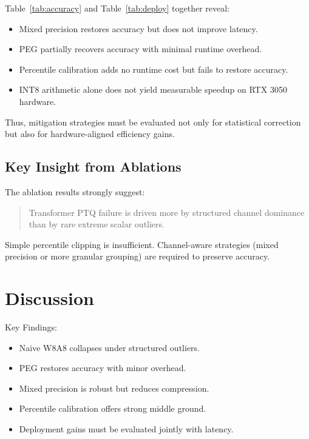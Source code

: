 \documentclass[conference]{IEEEtran}
\begin{document}
Table~\ref{tab:accuracy} and Table~\ref{tab:deploy} together reveal:

\begin{itemize}
\item Mixed precision restores accuracy but does not improve latency.
\item PEG partially recovers accuracy with minimal runtime overhead.
\item Percentile calibration adds no runtime cost but fails to restore accuracy.
\item INT8 arithmetic alone does not yield measurable speedup on RTX 3050 hardware.
\end{itemize}

Thus, mitigation strategies must be evaluated not only for statistical correction but also for hardware-aligned efficiency gains.

\subsection{Key Insight from Ablations}

The ablation results strongly suggest:

\begin{quote}
Transformer PTQ failure is driven more by structured channel dominance than by rare extreme scalar outliers.
\end{quote}

Simple percentile clipping is insufficient. Channel-aware strategies (mixed precision or more granular grouping) are required to preserve accuracy.

\section{Discussion}

Key Findings:

\begin{itemize}
\item Naive W8A8 collapses under structured outliers.
\item PEG restores accuracy with minor overhead.
\item Mixed precision is robust but reduces compression.
\item Percentile calibration offers strong middle ground.
\item Deployment gains must be evaluated jointly with latency.
\end{itemize}
\end{document}
